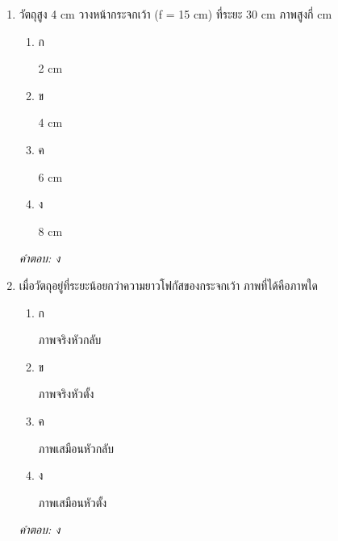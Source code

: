 \documentclass[12pt]{article}
\begin{document}
\begin{enumerate}[label=\arabic*., itemsep=0.5\baselineskip, topsep=0.5\baselineskip, leftmargin=*]
\item วัตถุสูง 4 cm วางหน้ากระจกเว้า (f = 15 cm) ที่ระยะ 30 cm ภาพสูงกี่ cm
\begin{enumerate}[label=\alph*)., itemsep=0.3\baselineskip, topsep=0.3\baselineskip]
\item ก\ 
\begin{minipage}[t]{0.9\linewidth}
\raggedright 2 cm
\end{minipage}
\item ข\ 
\begin{minipage}[t]{0.9\linewidth}
\raggedright 4 cm
\end{minipage}
\item ค\ 
\begin{minipage}[t]{0.9\linewidth}
\raggedright 6 cm
\end{minipage}
\item ง\ 
\begin{minipage}[t]{0.9\linewidth}
\raggedright 8 cm
\end{minipage}
\end{enumerate}
\vspace{-0.3\baselineskip}
\begin{small}
\textit{คำตอบ: ง}
\end{small}

\item เมื่อวัตถุอยู่ที่ระยะน้อยกว่าความยาวโฟกัสของกระจกเว้า ภาพที่ได้คือภาพใด
\begin{enumerate}[label=\alph*)., itemsep=0.3\baselineskip, topsep=0.3\baselineskip]
\item ก\ 
\begin{minipage}[t]{0.9\linewidth}
\raggedright ภาพจริงหัวกลับ
\end{minipage}
\item ข\ 
\begin{minipage}[t]{0.9\linewidth}
\raggedright ภาพจริงหัวตั้ง
\end{minipage}
\item ค\ 
\begin{minipage}[t]{0.9\linewidth}
\raggedright ภาพเสมือนหัวกลับ
\end{minipage}
\item ง\ 
\begin{minipage}[t]{0.9\linewidth}
\raggedright ภาพเสมือนหัวตั้ง
\end{minipage}
\end{enumerate}
\vspace{-0.3\baselineskip}
\begin{small}
\textit{คำตอบ: ง}
\end{small}


\end{enumerate}
\end{document}
